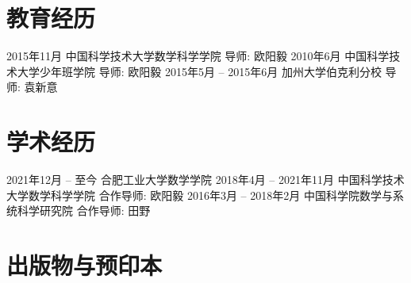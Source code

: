 \documentclass[11pt]{article}
\begin{document}
\author{张神星}
\address{安徽合肥丹霞路485号合肥工业大学翡翠科教楼B1810}
\maketitle

\section{教育经历}
\begin{cvstage}
		{2015年11月}
		{中国科学技术大学数学科学学院}
		{导师: 欧阳毅}
		{2010年6月}
		{中国科学技术大学少年班学院}
		{导师: 欧阳毅}
		{2015年5月 -- 2015年6月}
		{加州大学伯克利分校}
		{导师: 袁新意}
\end{cvstage}


\section{学术经历}
\begin{cvstage}
		{2021年12月 -- 至今}
		{合肥工业大学数学学院}
		{}
		{2018年4月 -- 2021年11月}
		{中国科学技术大学数学科学学院}
		{合作导师: 欧阳毅}
		{2016年3月 -- 2018年2月}
		{中国科学院数学与系统科学研究院}
		{合作导师: 田野}
\end{cvstage}


\section{出版物与预印本}
\end{document}
